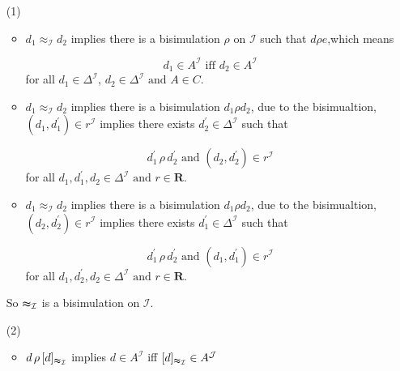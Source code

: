 \documentclass[12pt]{article}
\begin{document}
    \begin{enumerate}
        \item [(1)]
        \begin{itemize}
            \item $d_1 \approx_\mathcal{I} d_2$ implies there is a bisimulation $\rho$ on $\mathcal{I}$ such that $d \rho e$,which means \par
            \begin{equation}
                d_1\in A^\mathcal{I} \text{ iff } d_2\in A^\mathcal{I}
            \end{equation}
             for all $d_1 \in \Delta^{\mathcal{I}}$, $d_2 \in \Delta^{\mathcal{I}} \text{ and } A \in C$.\par
            \item $d_1\approx_\mathcal{I}d_2$ implies there is a bisimulation $d_1 \rho d_2$, due to the bisimualtion, $(d_1,d_1^{'})\in r^\mathcal{I}$ implies there exists $d_2^{'} \in \Delta^\mathcal{I}$ such that \par
            \begin{equation}
                d_1^{'}\,\rho\, d_2^{'} \text{ and } (d_2,d_2^{'})\in r^\mathcal{I}
            \end{equation}
            for all $d_1, d_1^{'}, d_2 \in \Delta^{\mathcal{I}} \text{ and }r\in \mathbf{R}$.\par
            \item $d_1\approx_\mathcal{I}d_2$ implies there is a bisimulation $d_1 \rho d_2$, due to the bisimualtion, $(d_2,d_2^{'})\in r^\mathcal{I}$ implies there exists $d_1^{'} \in \Delta^\mathcal{I}$ such that \par
            \begin{equation}
                d_1^{'}\,\rho\, d_2^{'} \text{ and } (d_1,d_1^{'})\in r^\mathcal{I}
            \end{equation}
            for all $d_1, d_2^{'}, d_2 \in \Delta^{\mathcal{I}} \text{ and }r\in \mathbf{R}$.\par
        \end{itemize}
        So $\thickapprox_{\mathcal{I}}$ is a bisimulation on $\mathcal{I}$. \par
        \item [(2)]
        \begin{itemize}
            \item $d\,\rho\,[d]_{\thickapprox_{\mathcal{I}}}$ implies $d\in A^\mathcal{I}$ iff $[d]_{\thickapprox_{\mathcal{I}}}\in A^\mathcal{J}$ \par

\end{itemize}
\end{enumerate}
\end{document}
